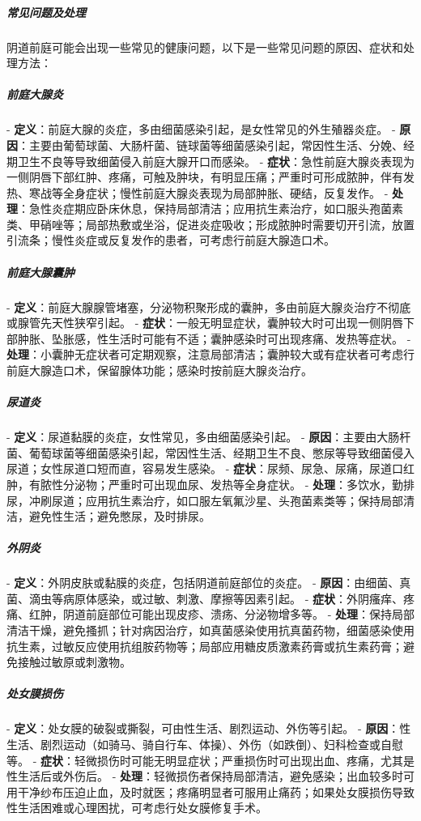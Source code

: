 \begin{enumerate}
\subparagraph{常见问题及处理}
阴道前庭可能会出现一些常见的健康问题，以下是一些常见问题的原因、症状和处理方法：

\subparagraph{前庭大腺炎}
- \textbf{定义}：前庭大腺的炎症，多由细菌感染引起，是女性常见的外生殖器炎症。
- \textbf{原因}：主要由葡萄球菌、大肠杆菌、链球菌等细菌感染引起，常因性生活、分娩、经期卫生不良等导致细菌侵入前庭大腺开口而感染。
- \textbf{症状}：急性前庭大腺炎表现为一侧阴唇下部红肿、疼痛，可触及肿块，有明显压痛；严重时可形成脓肿，伴有发热、寒战等全身症状；慢性前庭大腺炎表现为局部肿胀、硬结，反复发作。
- \textbf{处理}：急性炎症期应卧床休息，保持局部清洁；应用抗生素治疗，如口服头孢菌素类、甲硝唑等；局部热敷或坐浴，促进炎症吸收；形成脓肿时需要切开引流，放置引流条；慢性炎症或反复发作的患者，可考虑行前庭大腺造口术。

\subparagraph{前庭大腺囊肿}
- \textbf{定义}：前庭大腺腺管堵塞，分泌物积聚形成的囊肿，多由前庭大腺炎治疗不彻底或腺管先天性狭窄引起。
- \textbf{症状}：一般无明显症状，囊肿较大时可出现一侧阴唇下部肿胀、坠胀感，性生活时可能有不适；囊肿感染时可出现疼痛、发热等症状。
- \textbf{处理}：小囊肿无症状者可定期观察，注意局部清洁；囊肿较大或有症状者可考虑行前庭大腺造口术，保留腺体功能；感染时按前庭大腺炎治疗。

\subparagraph{尿道炎}
- \textbf{定义}：尿道黏膜的炎症，女性常见，多由细菌感染引起。
- \textbf{原因}：主要由大肠杆菌、葡萄球菌等细菌感染引起，常因性生活、经期卫生不良、憋尿等导致细菌侵入尿道；女性尿道口短而直，容易发生感染。
- \textbf{症状}：尿频、尿急、尿痛，尿道口红肿，有脓性分泌物；严重时可出现血尿、发热等全身症状。
- \textbf{处理}：多饮水，勤排尿，冲刷尿道；应用抗生素治疗，如口服左氧氟沙星、头孢菌素类等；保持局部清洁，避免性生活；避免憋尿，及时排尿。

\subparagraph{外阴炎}
- \textbf{定义}：外阴皮肤或黏膜的炎症，包括阴道前庭部位的炎症。
- \textbf{原因}：由细菌、真菌、滴虫等病原体感染，或过敏、刺激、摩擦等因素引起。
- \textbf{症状}：外阴瘙痒、疼痛、红肿，阴道前庭部位可能出现皮疹、溃疡、分泌物增多等。
- \textbf{处理}：保持局部清洁干燥，避免搔抓；针对病因治疗，如真菌感染使用抗真菌药物，细菌感染使用抗生素，过敏反应使用抗组胺药物等；局部应用糖皮质激素药膏或抗生素药膏；避免接触过敏原或刺激物。

\subparagraph{处女膜损伤}
- \textbf{定义}：处女膜的破裂或撕裂，可由性生活、剧烈运动、外伤等引起。
- \textbf{原因}：性生活、剧烈运动（如骑马、骑自行车、体操）、外伤（如跌倒）、妇科检查或自慰等。
- \textbf{症状}：轻微损伤时可能无明显症状；严重损伤时可出现出血、疼痛，尤其是性生活后或外伤后。
- \textbf{处理}：轻微损伤者保持局部清洁，避免感染；出血较多时可用干净纱布压迫止血，及时就医；疼痛明显者可服用止痛药；如果处女膜损伤导致性生活困难或心理困扰，可考虑行处女膜修复手术。


\end{enumerate}
